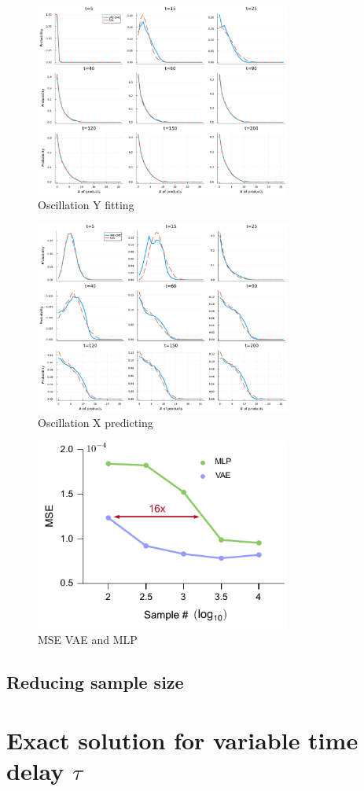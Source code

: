 \documentclass[a4paper,10pt]{article}
\begin{document}
\begin{figure}[h]
	\centering
	\includegraphics[width=0.75\textwidth]{Figs/Oscillation_Y_fitting.pdf}
	\caption{Oscillation Y fitting}\label{Oscillation_Y_fitting}  
\end{figure}

\begin{figure}[h]
	\centering
	\includegraphics[width=0.75\textwidth]{Figs/Oscillation_X_predicting.pdf}
	\caption{Oscillation X predicting}\label{Oscillation_X_predicting}  
\end{figure}

\begin{figure}[h]
	\centering
	\includegraphics[width=0.75\textwidth]{Figs/MSE_VAE_MLP.pdf}
	\caption{MSE VAE and MLP}\label{MSE_VAE_MLP}  
\end{figure}

\subsection{Reducing sample size}


\section{Exact solution for variable time delay $\tau$}



\end{document}
